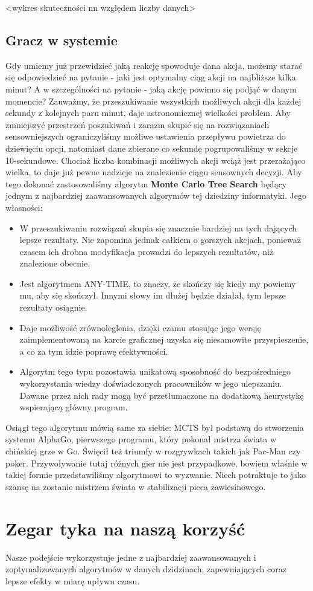 \documentclass[11pt]{article}
\begin{document}
<wykres skuteczności nn względem liczby danych>

\subsection{Gracz w systemie}
Gdy umiemy już przewidzieć jaką reakcję spowoduje dana akcja, możemy starać się odpowiedzieć na pytanie - jaki jest optymalny ciąg akcji na najbliższe kilka minut? A w szczególności na pytanie - jaką akcję powinno się podjąć w danym momencie? Zauważmy, że przeszukiwanie wszystkich możliwych akcji dla każdej sekundy z kolejnych paru minut, daje astronomicznej wielkości problem. Aby zmniejszyć przestrzeń poszukiwań i zarazm skupić się na rozwiązaniach sensowniejszych ograniczyliśmy możliwe ustawienia przepływu powietrza do dziewięciu opcji, natomiast dane zbierane co sekundę pogrupowaliśmy w sekcje 10-sekundowe. Chociaż liczba kombinacji możliwych akcji wciąż jest przerażająco wielka, to daje już pewne nadzieje na znalezienie ciągu sensownych decyzji. Aby tego dokonać zastosowaliśmy algorytm \textbf{Monte Carlo Tree Search} będący jednym z najbardziej zaawansowanych algorymów tej dziedziny informatyki. Jego własności:
\begin{itemize}
\item W przeszukiwaniu rozwiązań skupia się znacznie bardziej na tych dających lepsze rezultaty. Nie zapomina jednak całkiem o gorszych akcjach, ponieważ czasem ich drobna modyfikacja prowadzi do lepszych rezultatów, niż znalezione obecnie.
\item Jest algorytmem ANY-TIME, to znaczy, że skończy się kiedy my powiemy mu, aby się skończył. Innymi słowy im dłużej będzie działał, tym lepsze rezultaty osiągnie.
\item Daje możliwość zrównoleglenia, dzięki czamu stosując jego wersję zaimplementowaną na karcie graficznej uzyska się niesamowite przyspieszenie, a co za tym idzie poprawę efektywności.
\item Algorytm tego typu pozostawia unikatową sposobność do bezpośredniego wykorzystania wiedzy doświadczonych pracowników w jego ulepszaniu. Dawane przez nich rady mogą być przetłumaczone na dodatkową heurystykę wspierającą główny program.
\end{itemize}
Osiągi tego algorytmu mówią same za siebie: MCTS był podstawą do stworzenia systemu AlphaGo, pierwszego programu, który pokonał mistrza świata w chińskiej grze w Go. Święcił też triumfy w rozgrywkach takich jak Pac-Man czy poker. Przywoływanie tutaj różnych gier nie jest przypadkowe, bowiem właśnie w takiej formie przedstawiliśmy algorytmowi to wyzwanie. Niech potraktuje to jako szansę na zostanie mistrzem świata w stabilizacji pieca zawiesinowego.

\section{Zegar tyka na naszą korzyść}
Nasze podejście wykorzystuje jedne z najbardziej zaawansowanych i zoptymalizowanych algorytmów w danych dzidzinach, zapewniających coraz lepsze efekty w miarę upływu czasu.
\end{document}
